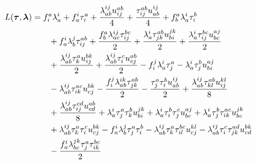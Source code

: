         \begin{align}
            L(\vfg{\clustamp}, \vfg{\clustlamp})
            &=
            \fockten^{a}_{i} \clustlamp^{i}_{a}
            + \fockten^{i}_{a} \clustamp^{a}_{i}
            + \frac{\clustlamp^{ij}_{ab} \twoten^{ab}_{ij}}{4}
            + \frac{\clustamp^{ab}_{ij} \twoten^{ij}_{ab}}{4}
            + \fockten^{a}_{b} \clustlamp^{i}_{a} \clustamp^{b}_{i}
            \nonumber \\
            &\qquad
            + \fockten^{i}_{a} \clustlamp^{j}_{b} \clustamp^{ab}_{ij}
            + \frac{\fockten^{a}_{b} \clustlamp^{ij}_{ac} \clustamp^{bc}_{ij}}{2}
            + \frac{\clustlamp^{i}_{a} \clustamp^{ab}_{jk} \twoten^{jk}_{bi}}{2}
            + \frac{\clustlamp^{i}_{a} \clustamp^{bc}_{ij} \twoten^{aj}_{bc}}{2}
            \nonumber \\
            &\qquad
            + \frac{\clustlamp^{ij}_{ab} \clustamp^{a}_{k} \twoten^{bk}_{ij}}{2}
            + \frac{\clustlamp^{ij}_{ab} \clustamp^{c}_{i} \twoten^{ab}_{cj}}{2}
            - \fockten^{j}_{i} \clustlamp^{i}_{a} \clustamp^{a}_{j}
            - \clustlamp^{i}_{a} \clustamp^{b}_{j} \twoten^{aj}_{bi}
            \nonumber \\
            &\qquad
            - \clustlamp^{ij}_{ab} \clustamp^{ac}_{ik} \twoten^{bk}_{cj}
            - \frac{\fockten^{j}_{i} \clustlamp^{ik}_{ab} \clustamp^{ab}_{jk}}{2}
            - \frac{\clustamp^{a}_{j} \clustamp^{b}_{i} \twoten^{ij}_{ab}}{2}
            + \frac{\clustlamp^{ij}_{ab} \clustamp^{ab}_{kl} \twoten^{kl}_{ij}}{8}
            \nonumber \\
            &\qquad
            + \frac{\clustlamp^{ij}_{ab} \clustamp^{cd}_{ij} \twoten^{ab}_{cd}}{8}
            + \clustlamp^{i}_{a} \clustamp^{a}_{j} \clustamp^{b}_{k} \twoten^{jk}_{bi}
            + \clustlamp^{i}_{a} \clustamp^{b}_{i} \clustamp^{c}_{j} \twoten^{aj}_{bc}
            + \clustlamp^{i}_{a} \clustamp^{b}_{j} \clustamp^{ac}_{ik} \twoten^{jk}_{bc}
            \nonumber \\
            &\qquad
            + \clustlamp^{ij}_{ab} \clustamp^{a}_{k} \clustamp^{c}_{i} \twoten^{bk}_{cj}
            - \fockten^{i}_{a} \clustlamp^{j}_{b} \clustamp^{a}_{j} \clustamp^{b}_{i}
            - \clustlamp^{ij}_{ab} \clustamp^{a}_{k} \clustamp^{bc}_{il} \twoten^{kl}_{cj}
            - \clustlamp^{ij}_{ab} \clustamp^{c}_{i} \clustamp^{ad}_{jk} \twoten^{bk}_{cd}
            \nonumber \\
            &\qquad
            - \frac{\fockten^{i}_{a} \clustlamp^{jk}_{bc} \clustamp^{a}_{j} \clustamp^{bc}_{ik}}{2}

\end{align}
